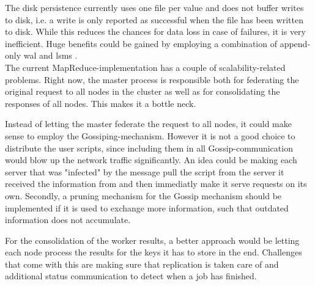 The disk persistence currently uses one file per value and does not buffer writes to disk,
i.e. a write is only reported as successful when the file has been written to disk.
While this reduces the chances for data loss in case of failures, it is very inefficient.
Huge benefits could be gained by employing a combination
of append-only \acf{wal} and \acp{lsm} \cite{ONeil1996}.\\[1em]

The current MapReduce-implementation has a couple of scalability-related problems.
Right now, the master process is responsible both for federating
the original request to all nodes in the cluster as well as for consolidating
the responses of all nodes.
This makes it a bottle neck.

Instead of letting the master federate the request to all nodes,
it could make sense to employ the Gossiping-mechanism.
However it is not a good choice to distribute the user scripts,
since including them in all Gossip-communication would blow up the
network traffic significantly.
An idea could be making each server that was "infected" by the message
pull the script from the server it received the information from and then
immediatly make it serve requests on its own.
Secondly, a pruning mechanism for the Gossip mechanism
should be implemented if it is used to exchange more information, such that
outdated information does not accumulate.

For the consolidation of the worker results, a better approach
would be letting each node process the results for the keys
it has to store in the end.
Challenges that come with this are making sure that
replication is taken care of and additional status communication
to detect when a job has finished.

